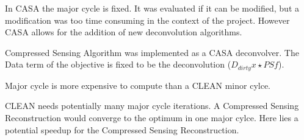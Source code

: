 In CASA the major cycle is fixed. It was evaluated if it can be modified, but a modification was too time consuming in the context of the project. However CASA allows for the addition of new deconvolution algorithms. 

Compressed Sensing Algorithm was implemented as a CASA deconvolver. The Data term of the objective is fixed to be the deconvolution ($D_{dirty} x \star PSf$). 


Major cycle is more expensive to compute than a CLEAN minor cylce. 

CLEAN needs potentially many major cycle iterations. A Compressed Sensing Reconstruction would converge to the optimum in one major cylce. Here lies a potential speedup for the Compressed Sensing Reconstruction.







 

